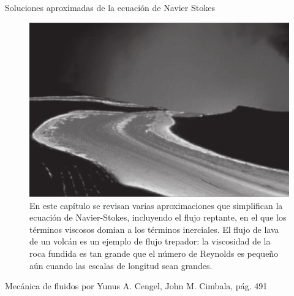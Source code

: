 \begin{frame}{Soluciones aproximadas de la ecuación de Navier Stokes}
\justifying

\begin{figure}[H]
\centering
\includegraphics[scale=0.2]{Section_Files/S3-imagenes-Jhon/0001.png}
\caption{En este capítulo se revisan varias aproximaciones que simplifican la ecuación de Navier-Stokes, incluyendo el flujo reptante, en el que los términos viscosos domian a los términos inerciales. El flujo de lava de un volcán es un ejemplo de flujo trepador: la viscosidad de la roca fundida es tan grande que el número de Reynolds es pequeño aún cuando las escalas de longitud sean grandes.}
\end{figure}

{\tiny Mecánica de fluidos por Yunus A. Cengel, John M. Cimbala, pág. 491}
\end{frame}


